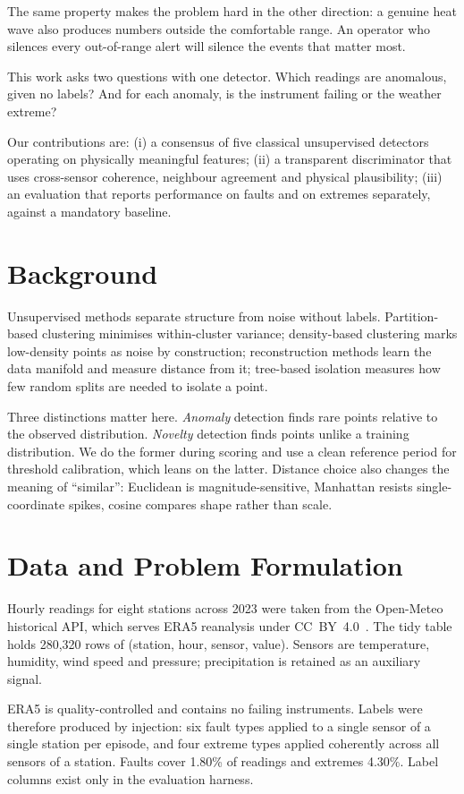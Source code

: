\documentclass[conference]{IEEEtran}
\begin{document}
The same property makes the problem hard in the other direction: a genuine heat wave also produces
numbers outside the comfortable range. An operator who silences every out-of-range alert will silence
the events that matter most.

This work asks two questions with one detector. Which readings are anomalous, given no labels? And
for each anomaly, is the instrument failing or the weather extreme?

Our contributions are: (i) a consensus of five classical unsupervised detectors operating on
physically meaningful features; (ii) a transparent discriminator that uses cross-sensor coherence,
neighbour agreement and physical plausibility; (iii) an evaluation that reports performance on faults
and on extremes separately, against a mandatory baseline.

\section{Background}
Unsupervised methods separate structure from noise without labels. Partition-based clustering
minimises within-cluster variance; density-based clustering marks low-density points as noise by
construction; reconstruction methods learn the data manifold and measure distance from it; tree-based
isolation measures how few random splits are needed to isolate a point.

Three distinctions matter here. \emph{Anomaly} detection finds rare points relative to the observed
distribution. \emph{Novelty} detection finds points unlike a training distribution. We do the former
during scoring and use a clean reference period for threshold calibration, which leans on the latter.
Distance choice also changes the meaning of ``similar'': Euclidean is magnitude-sensitive, Manhattan
resists single-coordinate spikes, cosine compares shape rather than scale.

\section{Data and Problem Formulation}
Hourly readings for eight stations across 2023 were taken from the Open-Meteo historical API, which
serves ERA5 reanalysis under CC~BY~4.0~\cite{openmeteo,era5}. The tidy table holds 280{,}320 rows of
(station, hour, sensor, value). Sensors are temperature, humidity, wind speed and pressure;
precipitation is retained as an auxiliary signal.

ERA5 is quality-controlled and contains no failing instruments. Labels were therefore produced by
injection: six fault types applied to a single sensor of a single station per episode, and four
extreme types applied coherently across all sensors of a station. Faults cover 1.80\% of readings and
extremes 4.30\%. Label columns exist only in the evaluation harness.
\end{document}
